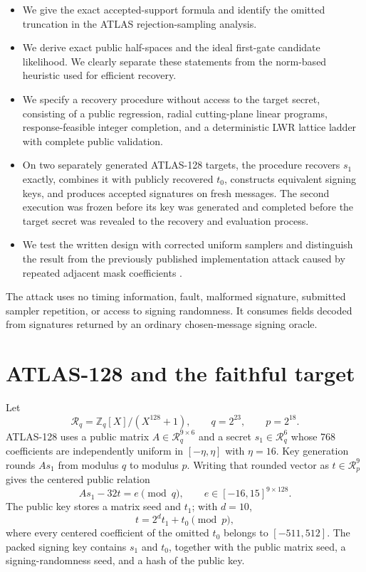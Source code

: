 \documentclass[11pt,a4paper]{article}
\newcommand{\Z}{\mathbb{Z}}
\newcommand{\R}{\mathcal{R}}
\begin{document}
\begin{itemize}[leftmargin=1.5em]
  \item We give the exact accepted-support formula and identify the omitted
        truncation in the ATLAS rejection-sampling analysis.
  \item We derive exact public half-spaces and the ideal first-gate candidate
        likelihood.  We clearly separate these statements from the
        norm-based heuristic used for efficient recovery.
  \item We specify a recovery procedure without access to the target secret,
        consisting of a public regression, radial cutting-plane linear
        programs, response-feasible integer completion, and a deterministic
        LWR lattice ladder with complete public validation.
  \item On two separately generated ATLAS-128 targets, the procedure recovers
        $s_1$ exactly, combines it with publicly recovered $t_0$, constructs
        equivalent signing keys, and produces accepted signatures on fresh
        messages.  The second execution was frozen before its key was
        generated and completed before the target secret was revealed to the
        recovery and evaluation process.
  \item We test the written design with corrected uniform samplers and
        distinguish the result from the previously published implementation
        attack caused by repeated adjacent mask coefficients \cite{NGCC15}.
\end{itemize}

The attack uses no timing information, fault, malformed signature, submitted
sampler repetition, or access to signing randomness.  It consumes fields
decoded from signatures returned by an ordinary chosen-message signing
oracle.

\section{ATLAS-128 and the faithful target}
\label{sec:atlas}

Let
\[
  \R_q=\Z_q[X]/(X^{128}+1),\qquad q=2^{23},\qquad p=2^{18}.
\]
ATLAS-128 uses a public matrix $A\in\R_q^{9\times6}$ and a secret
$s_1\in\R_q^6$ whose 768 coefficients are independently uniform in
$[-\eta,\eta]$ with $\eta=16$.  Key generation rounds $As_1$ from modulus
$q$ to modulus $p$.  Writing that rounded vector as $t\in\R_p^9$ gives the
centered public relation
\begin{equation}
                 As_1-32t=e\pmod q,
        \qquad e\in[-16,15]^{9\times128}.
\label{eq:lwr}
\end{equation}
The public key stores a matrix seed and $t_1$; with $d=10$,
\begin{equation}
                    t=2^d t_1+t_0\pmod p,
\label{eq:tdecomp}
\end{equation}
where every centered coefficient of the omitted $t_0$ belongs to
$[-511,512]$.  The packed signing key contains $s_1$ and $t_0$, together with
the public matrix seed, a signing-randomness seed, and a hash of the public
key.
\end{document}
